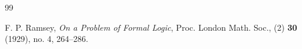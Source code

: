 \documentclass{amsart}
\theoremstyle{definition}
\theoremstyle{remark}
\numberwithin{equation}{section}
\begin{document}
\begin{thebibliography}{99}

   F. P. Ramsey, \textit{On a Problem of Formal Logic}, Proc. London Math. Soc., (2) \textbf{30} (1929), no. 4, 264–286.
	
	

	
	
\end{thebibliography}
\end{document}
